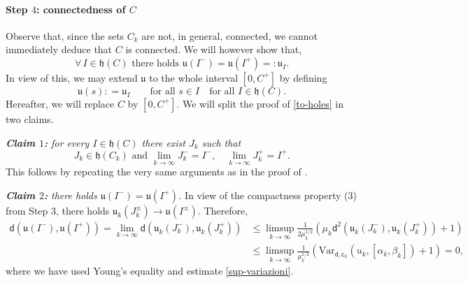 \documentclass[a4paper,10pt,reqno]{amsart} %
\numberwithin{equation}{section}
\newcommand{\mdn}{\mathsf{d}}
\newcommand{\md}[2]{\mathsf{d}(#1,#2)}
\newcommand{\Vari}[4]{\mathrm{Var}_{#1}(#2,[#3,#4])}
\newcommand{\vecostname}{\mathsf{c}}
\newcommand{\hole}[1]{\mathfrak{h}(#1)}
\newcommand{\invcur}[1]{\mathfrak{u}_{#1}}
\newcommand{\invcu}{\mathfrak{u}}
\newcommand{\RRR}{\color{red}}
\newcommand{\EEE}{\color{black}}
\begin{document}
 \paragraph{\bf Step $4$: connectedness of $C$}
Observe that, since the sets $C_k$ are not, in general, connected,
 we cannot immediately deduce that $C$ is connected. 
 We will however show that,
\begin{equation}
\label{to-holes}
\forall\, I \in \hole C \text{ there holds } \invcu (I^-) = \invcu(I^+) =: \invcu_I.
\end{equation} 
In view of this, we may extend $\invcu$ to the whole interval $[0,C^+]$ by defining
\[
\invcu(s): = \invcu_I \qquad \text{for all } s \in I \quad \text{for all } I \in \hole C.
\]
 Hereafter, we will replace $C$ by $[0,C^+]$. 
We will split the proof of \eqref{to-holes} in two claims.
\par
\emph{\textbf{Claim $1$:} 
 for every $ I \in \hole C $ there exist $J_k $ such that}
\begin{equation}
\label{che-fatica}
J_k \in \hole {C_k} \text{ and } \lim_{k\to\infty} J_k^-=I^-, \quad \lim_{k\to\infty} J_k^+=I^+.
\end{equation}
This follows by repeating the very same arguments as in the proof of  \cite[Thm.\ 5.3]{SavMin16}. 
\par
\emph{\textbf{Claim $2$:} there holds $\invcu (I^-) = \invcu(I^+) $.
} 
In view of the compactness property (3) from Step $3$, %
there holds   $\invcur k (J_k^\pm) \to \invcu (I^\pm)$. Therefore, 
\[
\begin{aligned}
\md{\invcu (I^-)}{\invcu(I^+)} = \lim_{k\to\infty} \md{\invcur k (J_k^-)}{\invcur k (J_k^+)}  & \leq 
\limsup_{k\to\infty}
 \frac1{2\mu_k^{1/2}}  \left( \mu_k \mdn^2(\invcur k (J_k^-),\invcur k (J_k^+)) + 1\right) \\ &  \leq
\limsup_{k\to\infty} \frac1{\mu_k^{1/2}}   \left( \Vari{\mdn,\vecostname_k}{u_k}{\alpha_k}{\beta_k} +1 \right)  =0, 
\end{aligned}
\]
where we have used Young's equality and  estimate  \eqref{sup-variazioni}. 
\end{document}
